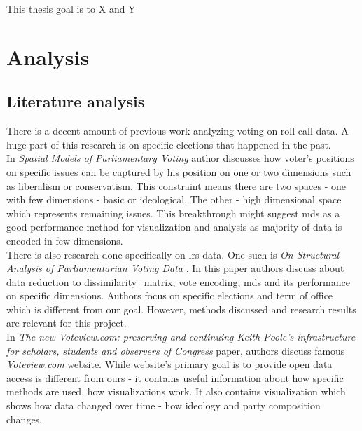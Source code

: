 \documentclass[a4paper,12pt]{article}
\begin{document}
	This thesis goal is to X and Y
    
    \clearpage
    
    \section{Analysis}
   
   	\subsection{Literature analysis}
   	
	There is a decent amount of previous work analyzing voting on roll call data. A huge part of this research is on specific elections that happened in the past.\\	
	
	In \textit{Spatial Models of Parliamentary Voting} \cite{poole_2005} author discusses how voter's positions on specific issues can be captured by his position on one or two dimensions such as liberalism or conservatism. This constraint means there are two spaces - one with few dimensions - basic  or ideological. The other - high dimensional space which represents remaining issues. This breakthrough might suggest \acrlong{mds} as a good performance method for visualization and analysis as majority of data is encoded in few dimensions.\\
	
	
	There is also research done specifically on \gls{lrs} data. One such is \textit{On Structural Analysis of Parliamentarian Voting Data} \cite{DBLP:journals/informaticaLT/KrilaviciusZ08}. In this paper authors discuss about data reduction to \gls{dissimilarity_matrix}, vote encoding, \gls{mds} and its performance on specific dimensions. Authors focus on specific elections and term of office which is different from our goal. However, methods discussed and research results are relevant for this project.\\
	
	In \textit{The new Voteview.com: preserving and continuing Keith Poole’s infrastructure for scholars, students and observers of Congress} \cite{article} paper, authors discuss famous \textit{Voteview.com} website. While website's primary goal is to provide open data access is different from ours - it contains useful information about how specific methods are used, how visualizations work. It also contains visualization which shows how data changed over time - how ideology and party composition changes.
	
\end{document}
